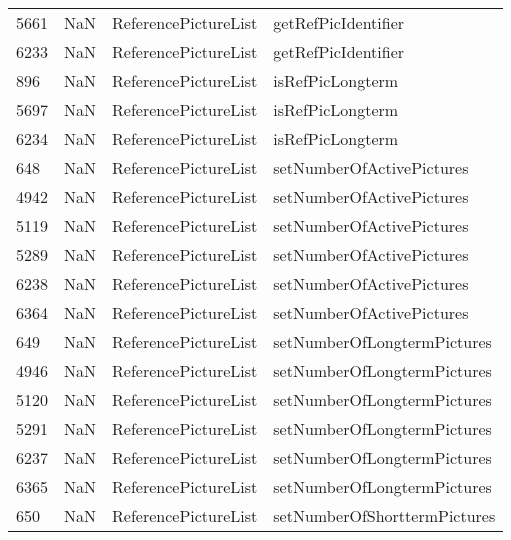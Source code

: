 \begin{tabular}{llll}
5661 &                   NaN &       ReferencePictureList &                       getRefPicIdentifier \\
6233 &                   NaN &       ReferencePictureList &                       getRefPicIdentifier \\
896  &                   NaN &       ReferencePictureList &                          isRefPicLongterm \\
5697 &                   NaN &       ReferencePictureList &                          isRefPicLongterm \\
6234 &                   NaN &       ReferencePictureList &                          isRefPicLongterm \\
648  &                   NaN &       ReferencePictureList &                 setNumberOfActivePictures \\
4942 &                   NaN &       ReferencePictureList &                 setNumberOfActivePictures \\
5119 &                   NaN &       ReferencePictureList &                 setNumberOfActivePictures \\
5289 &                   NaN &       ReferencePictureList &                 setNumberOfActivePictures \\
6238 &                   NaN &       ReferencePictureList &                 setNumberOfActivePictures \\
6364 &                   NaN &       ReferencePictureList &                 setNumberOfActivePictures \\
649  &                   NaN &       ReferencePictureList &               setNumberOfLongtermPictures \\
4946 &                   NaN &       ReferencePictureList &               setNumberOfLongtermPictures \\
5120 &                   NaN &       ReferencePictureList &               setNumberOfLongtermPictures \\
5291 &                   NaN &       ReferencePictureList &               setNumberOfLongtermPictures \\
6237 &                   NaN &       ReferencePictureList &               setNumberOfLongtermPictures \\
6365 &                   NaN &       ReferencePictureList &               setNumberOfLongtermPictures \\
650  &                   NaN &       ReferencePictureList &              setNumberOfShorttermPictures \\

\end{tabular}
